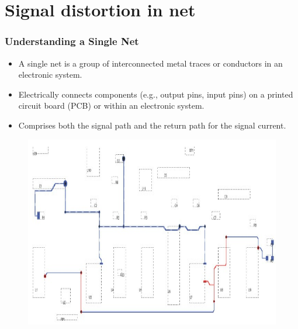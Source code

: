 \documentclass[10pt,hyperref={pdfpagemode=FullScreen},aspectratio=169]{beamer}
\begin{document}
\section{Signal distortion in net}

\begin{frame}
  \frametitle{Understanding a Single Net}
      \begin{itemize}
          \item A single net is a group of interconnected metal traces or conductors in an electronic system.
          \item Electrically connects components (e.g., output pins, input pins) on a printed circuit board (PCB) or within an electronic system.
          \item Comprises both the signal path and the return path for the signal current.
      \end{itemize}
      \begin{figure}
          \includegraphics[scale=0.3]{Fig/two_nets.png}
          \caption{}
      \end{figure}
  \end{frame}
\end{document}
